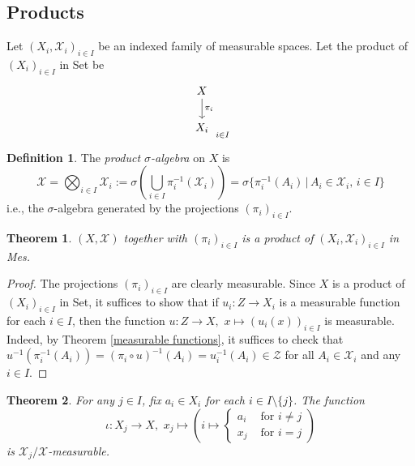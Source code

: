 \documentclass[11pt, a4paper, openany]{book}
\newtheorem{thm}{Theorem}\newtheorem{lem}{Lemma}\newtheorem{crl}{Corollary}
\theoremstyle{definition}
\newtheorem{define}{Definition}\newtheorem{exam}{Example}\newtheorem{remark}{Remark}
\newcommand{\cat}[1]{\textup{\textsf{#1}}}
\begin{document}
\subsection{Products}
    Let $(X_i,\mathscr{X}_i)_{i\in I}$ be an indexed family of measurable spaces. Let the product of $(X_i)_{i\in I}$ in \cat{Set} be
    \[
        \begin{tikzcd}
            X \ar[d, "\pi_i"]\\
            X_i
        \end{tikzcd}_{i\in I}
    \]
    \begin{define}
        The \textit{product $\sigma$-algebra} on $X$ is
        \[
            \mathscr{X}=\bigotimes_{i\in I}\mathscr{X}_i:=\sigma \left(\bigcup_{i\in I}\pi_{i}^{-1}(\mathscr{X}_i)\right)=\sigma\{\pi_i^{-1}(A_i)\,|\,A_i\in\mathscr{X}_i,\,i\in I\}
        \]
        i.e., the $\sigma$-algebra generated by the projections $(\pi_i)_{i\in I}$.
    \end{define}
    \begin{thm}\label{product measurable space}
        $(X,\mathscr{X})$ together with $(\pi_i)_{i\in I}$ is a product of $(X_i,\mathscr{X}_i)_{i\in I}$ in \cat{Mes}.
    \end{thm}
    \begin{proof}
        The projections $(\pi_i)_{i\in I}$ are clearly measurable.
        Since $X$ is a product of $(X_i)_{i\in I}$ in \cat{Set}, it suffices to show that if $u_i:Z\rightarrow X_i$ is a measurable function for each $i\in I$, then the function $u:Z\rightarrow X,\,\,x\mapsto (u_i(x))_{i\in I}$ is measurable. Indeed, by Theorem \ref{measurable functions}, it suffices to check that $u^{-1}(\pi_i^{-1}(A_i))=(\pi_i\circ u)^{-1}(A_i)=u_i^{-1}(A_i)\in\mathscr{Z}$ for all $A_i\in\mathscr{X}_i$ and any $i\in I$.
    \end{proof}
    \begin{thm}\label{sections are measurable}
        For any $j\in I$, fix $a_i\in X_i$ for each $i\in I\setminus \{j\}$. The function
        \[
            \iota:X_j\rightarrow X,\,\,x_j\mapsto \left(i\mapsto \begin{cases}
                a_i&\text{ for }i\neq j\\
                x_j&\text{ for }i=j
            \end{cases}\right)
        \]
        is $\mathscr{X}_j/\mathscr{X}$-measurable.
    \end{thm}
\end{document}
